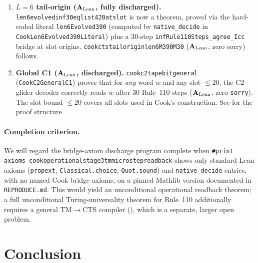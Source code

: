 \documentclass[11pt]{article}
\theoremstyle{remark}
\newcommand{\CatAL}{\ensuremath{\textbf{A}_{\rm Lean}}}
\newcommand{\lean}[1]{%
  \penalty-100
  \begingroup\def\_{\textunderscore\allowbreak}\texttt{#1}\endgroup}
\begin{document}
\begin{enumerate}[leftmargin=1.5em,start=4]
  \item \textbf{$L{=}6$ tail-origin ($\CatAL$, fully discharged).}
    \lean{len6\_evolved\_inf30\_eq\_list420\_at\_slot} is now a theorem, proved via the
    hard-coded literal \lean{len6Evolved390} (computed by \texttt{native\_decide} in
    \texttt{CookLen6Evolved390Literal}) plus a 30-step \texttt{infRule110Steps\_agree\_Icc}
    bridge at slot origins.
    \lean{cook\_cts\_tail\_origin\_len6\_M390\_M30} ($\CatAL$, zero sorry) follows.

  \item \textbf{Global C1 ($\CatAL$, discharged).}
    \lean{cook\_c2\_tape\_bit\_general} (\texttt{CookC2GeneralC1}) proves that for
    \emph{any} word $w$ and any slot $\le 20$, the C2 glider decoder correctly reads
    $w$ after $30$ Rule~110 steps ($\CatAL$, zero \texttt{sorry}).
    The slot bound $\le 20$ covers all slots used in Cook's construction.
    See  for the proof structure.
\end{enumerate}

\paragraph{Completion criterion.}
We will regard the bridge-axiom discharge program complete when
\lean{\#print axioms cook\_operational\_stage3\_tm\_microstep\_readback}
shows only standard Lean axioms (\texttt{propext}, \texttt{Classical.choice}, \texttt{Quot.sound})
and \texttt{native\_decide} entries, with no named Cook bridge axioms, on a pinned
Mathlib version documented in \texttt{REPRODUCE.md}.  This would yield an unconditional
operational readback theorem; a full unconditional Turing-universality theorem for Rule~110
additionally requires a general TM$\to$CTS compiler (), which is a separate,
larger open problem.

\section{Conclusion}
\label{sec:conclusion}
\end{document}

